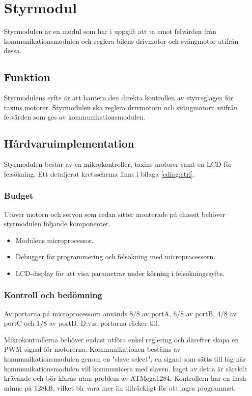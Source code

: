 \documentclass[designspec/spec.tex]{subfiles}
\begin{document}
\section{Styrmodul}
Styrmodulen är en modul som har i uppgift att ta emot felvärden från
kommunikationsmodulen och reglera bilens drivmotor och svängmotor utifrån
dessa.

\subsection{Funktion}
Styrmodulens syfte är att hantera den direkta kontrollen av styrreglagen för
taxins motorer. Styrmodulen ska reglera drivmotorn och svängmotorn utifrån
felvärden som ges av kommunikationsmodulen.

\subsection{Hårdvaruimplementation}
Styrmodulen består av en mikrokontroller, taxins motorer samt en LCD för
felsökning. Ett detaljerat kretsschema finns i bilaga \ref{cdiag:ctrl}.

\subsubsection{Budget}
Utöver motorn och servon som redan sitter monterade på chassit behöver
styrmodulen följande komponenter.
\begin{itemize}
	\item \textbf{\modMicrocontroller} Modulens microprocessor. 
    \item \textbf{\modJtag} Debugger för programmering och felsökning med
        microprocessorn. 
    \item \textbf{\modLcd} LCD-display för att visa parametrar under körning i
        felsökningssyfte.
\end{itemize}

\subsubsection{Kontroll och bedömning}
Av portarna på microprocessorn används 8/8 av portA, 6/8 av portB, 4/8 av portC
och 1/8 av portD. D.v.s. portarna räcker till.

Mikrokontrollerna behöver endast utföra enkel reglering och därefter skapa en
PWM-signal för motorerna. Kommunikationen bestäms av kommunikationsmodulen
genom en "slave select", en signal som sätts till låg när kommunikationsmodulen
vill kommunicera med slaven.  Inget av detta är särskilt krävande och bör
klaras utan problem av ATMega1284.  Kontrollern har en flash-minne på 128kB,
vilket blr vara mer än tillräckligt för att lagra programmet.
\end{document}

